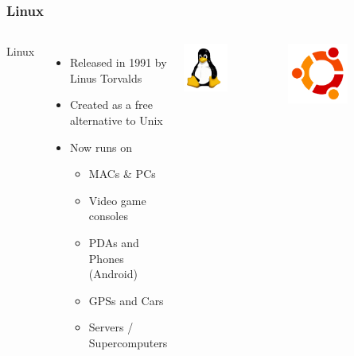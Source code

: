 \documentclass{beamer}
\begin{document}
\begin{frame}
  \frametitle{Linux}
  \begin{columns}
    \begin{LARGE}
      Linux
    \end{LARGE}
    \begin{itemize}
    \item Released in 1991 by Linus Torvalds
    \item Created as a free alternative to Unix
    \item Now runs on
      \begin{itemize}
      \item MACs \& PCs
      \item Video game consoles
      \item PDAs and Phones (Android)
      \item GPSs and Cars
      \item Servers / Supercomputers
      \end{itemize}
    \end{itemize}
      \begin{center}\includegraphics[width=0.5\textwidth]{../img/tux}\end{center}
      
      \begin{center}\includegraphics[width=0.5\textwidth]{../img/ubuntu}\end{center}
  \end{columns}
\end{frame}
\end{document}
